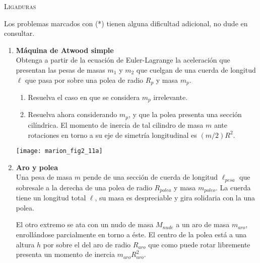 \documentclass[11pt, spanish, a4paper, twoside]{article}
\begin{document}
\begin{center}
  \textsc{\large Ligaduras}
\end{center}

\noindent
Los problemas marcados con (*) tienen alguna dificultad adicional, no dude en consultar.
\begin{enumerate}


\item 
\begin{minipage}[t][3.5cm]{0.68\textwidth}
	\textbf{Máquina de Atwood simple}\\
	Obtenga a partir de la ecuación de Euler-Lagrange la aceleración que presentan las pesas de masas \(m_1\) y \(m_2\) que cuelgan de una cuerda de longitud \(\ell\) que pasa por sobre una polea de radio \(R_p\) y masa \(m_p\).
	\begin{enumerate}
		\item Resuelva el caso en que se considera \(m_p\) irrelevante.
		\item Resuelva ahora considerando \(m_p\), y que la polea presenta una sección cilíndrica.
			El momento de inercia de tal cilindro de masa \(m\) ante rotaciones en torno a su eje de simetría longitudinal es \((m/2) R^2\).
	\end{enumerate}
\end{minipage}
\begin{minipage}[c][0.5cm][t]{0.3\textwidth}
	\texttt{[image: marion\_fig2\_11a]}
\end{minipage}


\item 
	\begin{minipage}[t][3.5cm]{0.8\textwidth}
		\textbf{Aro y polea}\\
		Una pesa de masa \(m\) pende de una sección de cuerda de longitud \(\ell_{pesa}\) que sobresale a la derecha de una polea de radio \(R_{polea}\) y masa \(m_{poleo}\).
		La cuerda tiene un longitud total \(\ell\), su  masa es despreciable y gira solidaria con la una polea.

		El otro extremo se ata con un nudo de masa \(M_{nude}\) a un aro de masa \(m_{aro}\), enrollándose parcialmente en torno a éste.
		El centro de la polea está a una altura \(h\) por sobre el del aro de radio \(R_{aro}\) que como puede rotar libremente presenta un momento de inercia \(m_{aro} R_{aro}^2\).
		

\end{minipage}
\end{enumerate}
\end{document}
